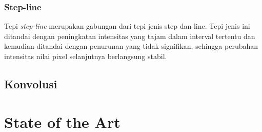 \subsubsection{Step-line}
Tepi \textit{step-line} merupakan gabungan dari tepi jenis step dan line. Tepi jenis ini ditandai dengan peningkatan intensitas yang tajam dalam interval tertentu dan kemudian ditandai dengan penurunan yang tidak signifikan, sehingga perubahan intensitas nilai pixel selanjutnya berlangsung stabil.




\subsection{Konvolusi}
\blindtext


\section{State of the Art}
\blindtext
